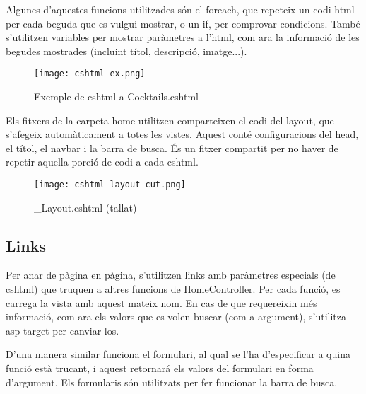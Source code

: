 Algunes d'aquestes funcions utilitzades s\'on el foreach,
que repeteix un codi html per cada beguda que es vulgui mostrar,
o un if, per comprovar condicions.
Tamb\'e s'utilitzen variables per mostrar par\`ametres a l'html,
com ara la informaci\'o de les begudes mostrades
(incluint t\'itol, descripci\'o, imatge...).

\begin{figure}[!h]
	\centering
	\texttt{[image: cshtml-ex.png]}
	\caption{Exemple de cshtml a Cocktails.cshtml}
\end{figure}

Els fitxers de la carpeta home utilitzen comparteixen el codi del layout,
que s'afegeix autom\`aticament a totes les vistes.
Aquest cont\'e configuracions del head, el t\'itol, el navbar i la barra de busca.
\'Es un fitxer compartit per no haver de repetir aquella porci\'o de codi a cada cshtml.

\begin{figure}[!h]
	\centering
	\texttt{[image: cshtml-layout-cut.png]}
	\caption{\_Layout.cshtml (tallat)}
\end{figure}

\subsection{Links}
Per anar de p\`agina en p\`agina,
s'utilitzen links amb par\`ametres especials (de cshtml)
que truquen a altres funcions de HomeController.
Per cada funci\'o, es carrega la vista amb aquest mateix nom.
En cas de que requereixin m\'es informaci\'o,
com ara els valors que es volen buscar (com a argument),
s'utilitza asp-target per canviar-los.

D'una manera similar funciona el formulari,
al qual se l'ha d'especificar a quina funci\'o est\`a trucant,
i aquest retornar\'a els valors del formulari en forma d'argument.
Els formularis s\'on utilitzats per fer funcionar la barra de busca.
